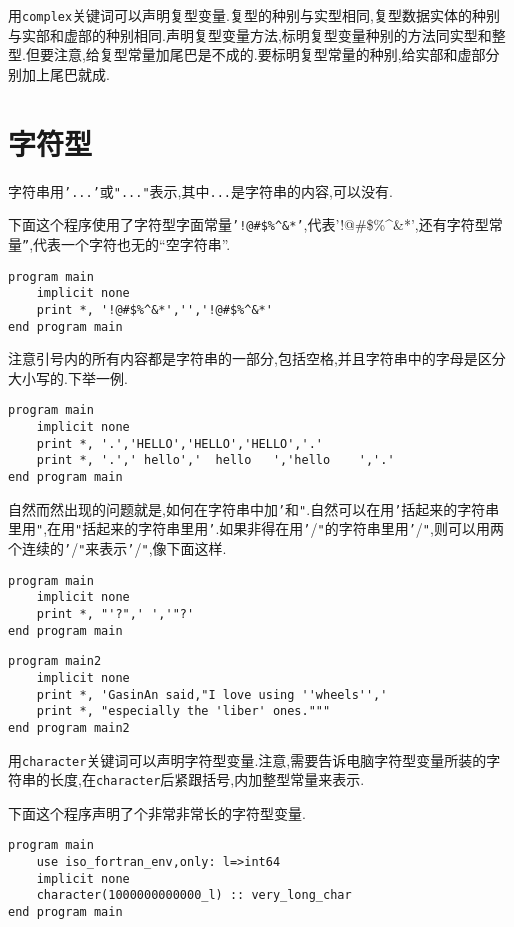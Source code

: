 用\texttt{complex}关键词可以声明复型变量.复型的种别与实型相同,复型数据实体的种别与实部和虚部的种别相同.声明复型变量方法,标明复型变量种别的方法同实型和整型.但要注意,给复型常量加尾巴是不成的.要标明复型常量的种别,给实部和虚部分别加上尾巴就成.

\section{字符型}\label{fortran_char}

字符串用\texttt{'...'}或\texttt{"..."}表示,其中\texttt{...}是字符串的内容,可以没有.

下面这个程序使用了字符型字面常量\texttt{'!@\#{}\${}\%{}\^{}\&{}*'},代表'!@\#{}\${}\%{}\^{}\&{}*',还有字符型常量\texttt{''},代表一个字符也无的``空字符串''.
\begin{lstlisting}
program main
    implicit none
    print *, '!@#$%^&*','','!@#$%^&*'
end program main
\end{lstlisting}

注意引号内的所有内容都是字符串的一部分,包括空格,并且字符串中的字母是区分大小写的.下举一例.
\begin{lstlisting}
program main
    implicit none
    print *, '.','HELLO','HELLO','HELLO','.'
    print *, '.',' hello','  hello   ','hello    ','.'
end program main
\end{lstlisting}

自然而然出现的问题就是,如何在字符串中加\texttt{'}和\texttt{"}.自然可以在用\texttt{'}括起来的字符串里用\texttt{"},在用\texttt{"}括起来的字符串里用\texttt{'}.如果非得在用\texttt{'}/\texttt{"}的字符串里用\texttt{'}/\texttt{"},则可以用两个连续的\texttt{'}/\texttt{"}来表示\texttt{'}/\texttt{"},像下面这样.
\begin{lstlisting}
program main
    implicit none
    print *, "'?",' ','"?'
end program main
\end{lstlisting}
\begin{lstlisting}
program main2
    implicit none
    print *, 'GasinAn said,"I love using ''wheels'','
    print *, "especially the 'liber' ones."""
end program main2
\end{lstlisting}

用\texttt{character}关键词可以声明字符型变量.注意,需要告诉电脑字符型变量所装的字符串的长度,在\texttt{character}后紧跟括号,内加整型常量来表示.

下面这个程序声明了个非常非常长的字符型变量.
\begin{lstlisting}
program main
    use iso_fortran_env,only: l=>int64
    implicit none
    character(1000000000000_l) :: very_long_char
end program main
\end{lstlisting}

